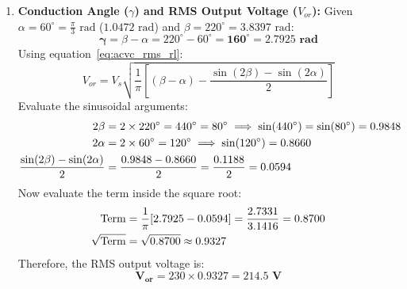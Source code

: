 \documentclass[11pt,a4paper]{article}
\begin{document}
\begin{examplebox}
\begin{enumerate}
  \item \textbf{Conduction Angle ($\gamma$) and RMS Output Voltage ($V_{or}$):}
  Given $\alpha = 60^\circ = \frac{\pi}{3}\text{ rad}$ ($1.0472\text{ rad}$) and $\beta = 220^\circ = 3.8397\text{ rad}$:
  \begin{equation*}
  \mathbf{\gamma} = \beta - \alpha = 220^\circ - 60^\circ = \mathbf{160^\circ = 2.7925\text{ rad}}
  \end{equation*}
  Using equation~\eqref{eq:acvc_rms_rl}:
  \begin{equation*}
  V_{or} = V_s \sqrt{\frac{1}{\pi} \left[ (\beta - \alpha) - \frac{\sin(2\beta) - \sin(2\alpha)}{2} \right]}
  \end{equation*}
  Evaluate the sinusoidal arguments:
  \begin{align*}
  2\beta &= 2 \times 220^\circ = 440^\circ = 80^\circ \implies \sin(440^\circ) = \sin(80^\circ) = 0.9848 \notag\\
  2\alpha &= 2 \times 60^\circ = 120^\circ \implies \sin(120^\circ) = 0.8660 \notag\\
  \frac{\sin(2\beta) - \sin(2\alpha)}{2} &= \frac{0.9848 - 0.8660}{2} = \frac{0.1188}{2} = 0.0594
  \end{align*}
  Now evaluate the term inside the square root:
  \begin{align*}
  \text{Term} &= \frac{1}{\pi} [2.7925 - 0.0594] = \frac{2.7331}{3.1416} = 0.8700 \notag\\
  \sqrt{\text{Term}} &= \sqrt{0.8700} \approx 0.9327
  \end{align*}
  Therefore, the RMS output voltage is:
  \begin{equation*}
  \mathbf{V_{or}} = 230 \times 0.9327 = \mathbf{214.5\text{ V}}
  \end{equation*}
\end{enumerate}
\end{examplebox}
\end{document}
